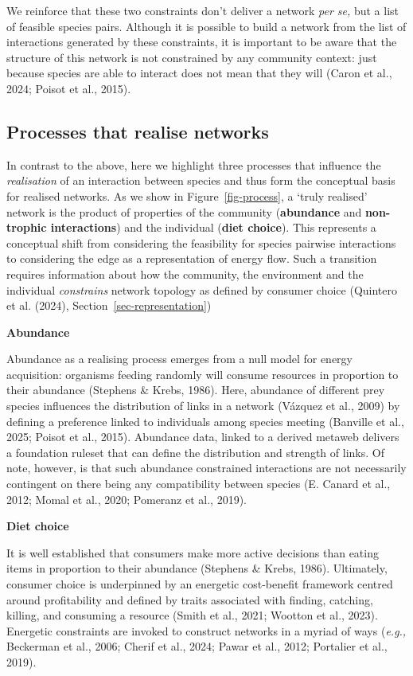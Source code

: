 \documentclass[
]{article}
\begin{document}
We reinforce that these two constraints don't deliver a network
\emph{per se,} but a list of feasible species pairs. Although it is
possible to build a network from the list of interactions generated by
these constraints, it is important to be aware that the structure of
this network is not constrained by any community context: just because
species are able to interact does not mean that they will (Caron et al.,
2024; Poisot et al., 2015).

\subsection{Processes that realise
networks}\label{sec-process-realisation}

In contrast to the above, here we highlight three processes that
influence the \emph{realisation} of an interaction between species and
thus form the conceptual basis for realised networks. As we show in
Figure~\ref{fig-process}, a `truly realised' network is the product of
properties of the community (\textbf{abundance} and \textbf{non-trophic
interactions}) and the individual (\textbf{diet choice}). This
represents a conceptual shift from considering the feasibility for
species pairwise interactions to considering the edge as a
representation of energy flow. Such a transition requires information
about how the community, the environment and the individual
\emph{constrains} network topology as defined by consumer choice
(Quintero et al. (2024), Section~\ref{sec-representation})

\textbf{Abundance}

Abundance as a realising process emerges from a null model for energy
acquisition: organisms feeding randomly will consume resources in
proportion to their abundance (Stephens \& Krebs, 1986). Here, abundance
of different prey species influences the distribution of links in a
network (Vázquez et al., 2009) by defining a preference linked to
individuals among species meeting (Banville et al., 2025; Poisot et al.,
2015). Abundance data, linked to a derived metaweb delivers a foundation
ruleset that can define the distribution and strength of links. Of note,
however, is that such abundance constrained interactions are not
necessarily contingent on there being any compatibility between species
(E. Canard et al., 2012; Momal et al., 2020; Pomeranz et al., 2019).

\textbf{Diet choice}

It is well established that consumers make more active decisions than
eating items in proportion to their abundance (Stephens \& Krebs, 1986).
Ultimately, consumer choice is underpinned by an energetic cost-benefit
framework centred around profitability and defined by traits associated
with finding, catching, killing, and consuming a resource (Smith et al.,
2021; Wootton et al., 2023). Energetic constraints are invoked to
construct networks in a myriad of ways (\emph{e.g.,} Beckerman et al.,
2006; Cherif et al., 2024; Pawar et al., 2012; Portalier et al., 2019).
\end{document}
